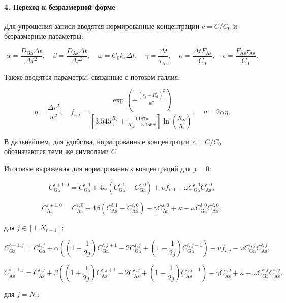 \documentclass[14pt,oneside]{extarticle}
\begin{document}
\paragraph{4. Переход к безразмерной форме}

Для упрощения записи вводятся нормированные концентрации \( c = C / C_0 \) и безразмерные параметры:

\[
\alpha = \frac{D_{\text{Ga}} \Delta t}{\Delta r^2}, \quad
\beta = \frac{D_{\text{As}} \Delta t}{\Delta r^2}, \quad
\omega = C_0 k_r \Delta t, \quad
\gamma = \frac{\Delta t}{\tau_{\text{As}}}, \quad
\kappa = \frac{\Delta t F_{\text{As}}}{C_0}, \quad
\epsilon = \frac{F_{\text{As}} \tau_{\text{As}}}{C_0}.
\]

Также вводятся параметры, связанные с потоком галлия:

\[
\eta = \frac{\Delta r^2}{w^2}, \quad
f_{i,j} = \frac{\exp\left( -\frac{(r_j - R_d^i)^2}{w^2} \right)}
{\left[3.545 \frac{R_d^i}{w} + \frac{0.187 w}{R_\infty - 3.156 w}\right] \ln\left( \frac{R_\infty}{R_d^i} \right)}, \quad
\upsilon = 2 \alpha \eta.
\]

В дальнейшем, для удобства, нормированные концентрации \( c = C / C_0 \)
обозначаются теми же символами \( C \).

Итоговые выражения для нормированных концентраций для $j=0$:

\[
C_{\text{Ga}}^{i+1,0} = C_{\text{Ga}}^{i,0}
+ 4 \alpha (C_{\text{Ga}}^{i,1} - C_{\text{Ga}}^{i,0})
+ \upsilon f_{i,0}
- \omega C_{\text{Ga}}^{i,0} C_{\text{As}}^{i,0},
\]

\[
C_{\text{As}}^{i+1,0} = C_{\text{As}}^{i,0}
+ 4 \beta (C_{\text{As}}^{i,1} - C_{\text{As}}^{i,0})
- \gamma C_{\text{As}}^{i,0}
+ \kappa
- \omega C_{\text{Ga}}^{i,0} C_{\text{As}}^{i,0},
\]

для $j\in\left[1,N_{r-1}\right]$:

\[
C_{\text{Ga}}^{i+1,j} = C_{\text{Ga}}^{i,j}
+ \alpha \left( \left(1+\frac{1}{2j}\right) C_{\text{Ga}}^{i,j+1}
- 2 C_{\text{Ga}}^{i,j}
+ \left(1-\frac{1}{2j}\right) C_{\text{Ga}}^{i,j-1} \right)
+ \upsilon f_{i,j}
- \omega C_{\text{Ga}}^{i,j} C_{\text{As}}^{i,j},
\]

\[
C_{\text{As}}^{i+1,j} = C_{\text{As}}^{i,j}
+ \beta \left( \left(1+\frac{1}{2j}\right) C_{\text{As}}^{i,j+1}
- 2 C_{\text{As}}^{i,j}
+ \left(1-\frac{1}{2j}\right) C_{\text{As}}^{i,j-1} \right)
- \gamma C_{\text{As}}^{i,j}
+ \kappa
- \omega C_{\text{Ga}}^{i,j} C_{\text{As}}^{i,j}.
\]

для $j=N_{r}$:
\end{document}
